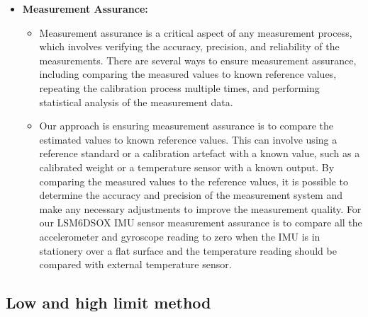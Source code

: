 \begin{itemize}
\begin{enumerate}
		The estimated bias, drift, and noise values for each axis are stored in the sensor's memory or in a separate data storage device. These values can be used to correct for errors in subsequent measurements taken by the sensor. The storage location and format of the values depend on the sensor and the application. Some sensors have built-in memory, while others may require an external storage device. The values may be stored in a binary or text format depending on the application's requirements.
		
	\end{enumerate}
	
	
	
	\item \textbf{Measurement Assurance:}
	
	\begin{itemize}
		\item Measurement assurance is a critical aspect of any measurement process, which involves verifying the accuracy, precision, and reliability of the measurements. There are several ways to ensure measurement assurance, including comparing the measured values to known reference values, repeating the calibration process multiple times, and performing statistical analysis of the measurement data.
		
		\item Our approach is ensuring measurement assurance is to compare the estimated values to known reference values. This can involve using a reference standard or a calibration artefact with a known value, such as a calibrated weight or a temperature sensor with a known output. By comparing the measured values to the reference values, it is possible to determine the accuracy and precision of the measurement system and make any necessary adjustments to improve the measurement quality. For our LSM6DSOX IMU sensor measurement assurance is to compare all the accelerometer and gyroscope reading to zero when the IMU is in stationery over a flat surface and the temperature reading should be compared with external temperature sensor. 
	\end{itemize}
	
\end{itemize}

\subsection{Low and high limit method}

